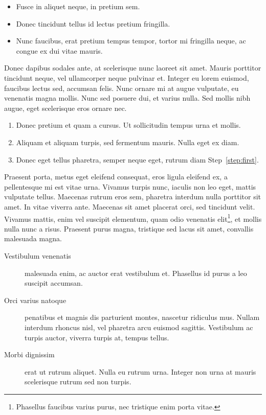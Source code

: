 \begin{itemize}
	\item Fusce in aliquet neque, in pretium sem.
	\item Donec tincidunt tellus id lectus pretium fringilla.
	\item Nunc faucibus, erat pretium tempus tempor, tortor mi fringilla neque, ac congue ex dui vitae mauris.
\end{itemize}

Donec dapibus sodales ante, at scelerisque nunc laoreet sit amet. Mauris porttitor tincidunt neque, vel ullamcorper neque pulvinar et. Integer eu lorem euismod, faucibus lectus sed, accumsan felis. Nunc ornare mi at augue vulputate, eu venenatis magna mollis. Nunc sed posuere dui, et varius nulla. Sed mollis nibh augue, eget scelerisque eros ornare nec.

\begin{enumerate}
	\item\label{step:first} Donec pretium et quam a cursus. Ut sollicitudin tempus urna et mollis.
	\item Aliquam et aliquam turpis, sed fermentum mauris. Nulla eget ex diam.
	\item Donec eget tellus pharetra, semper neque eget, rutrum diam Step~\ref{step:first}.
\end{enumerate}

Praesent porta, metus eget eleifend consequat, eros ligula eleifend ex, a pellentesque mi est vitae urna. Vivamus turpis nunc, iaculis non leo eget, mattis vulputate tellus. Maecenas rutrum eros sem, pharetra interdum nulla porttitor sit amet. In vitae viverra ante. Maecenas sit amet placerat orci, sed tincidunt velit. Vivamus mattis, enim vel suscipit elementum, quam odio venenatis elit\footnote{Phasellus faucibus varius purus, nec tristique enim porta vitae.}, et mollis nulla nunc a risus. Praesent purus magna, tristique sed lacus sit amet, convallis malesuada magna.

\begin{description}
	\item[Vestibulum venenatis] malesuada enim, ac auctor erat vestibulum et. Phasellus id purus a leo suscipit accumsan.
	\item[Orci varius natoque] penatibus et magnis dis parturient montes, nascetur ridiculus mus. Nullam interdum rhoncus nisl, vel pharetra arcu euismod sagittis. Vestibulum ac turpis auctor, viverra turpis at, tempus tellus.
	\item[Morbi dignissim] erat ut rutrum aliquet. Nulla eu rutrum urna. Integer non urna at mauris scelerisque rutrum sed non turpis.
\end{description}

